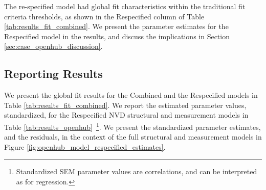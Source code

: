 The re-specified model had global fit characteristics within the traditional fit criteria thresholds, as shown in the Respecified column of Table \ref{tab:results_fit_combined}. We present the parameter estimates for the Respecified model in the results, and discuss the implications in Section \ref{sec:case_openhub_discussion}.

\subsection{Reporting Results}
\label{sec:case_openhub_results}

We present the global fit results for the Combined and the Respecified models in Table \ref{tab:results_fit_combined}. We report the estimated parameter values, standardized, for the Respecified NVD structural and measurement models in Table \ref{tab:results_openhub}~\footnote{Standardized SEM parameter values are correlations, and can be interpreted as for regression.}. We present the standardized parameter estimates, and the residuals, in the context of the full structural and measurement models in Figure \ref{fig:openhub_model_respecified_estimates}.

